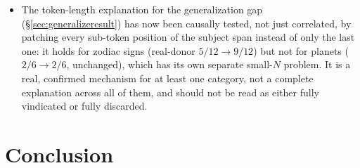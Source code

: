 \documentclass[11pt]{article}
\begin{document}
\begin{itemize}
        with no valid successor, and its headline accuracy is not
        statistically distinguishable from chance. Reporting binomial
        $p$-values and Wilson confidence intervals throughout this paper
        (added after the results above were first obtained) makes this
        precise rather than hiding it behind a bare percentage, but it does
        not fix the underlying small sample; a category with a genuinely
        real but modest effect and a category with no effect at all can
        look identical at $N=6$.
  \item The token-length explanation for the generalization gap
        (\S\ref{sec:generalizeresult}) has now been causally tested, not
        just correlated, by patching every sub-token position of the
        subject span instead of only the last one: it holds for zodiac
        signs (real-donor $5/12\to9/12$) but not for planets ($2/6\to2/6$,
        unchanged), which has its own separate small-$N$ problem. It is a
        real, confirmed mechanism for at least one category, not a complete
        explanation across all of them, and should not be read as either
        fully vindicated or fully discarded.
\end{itemize}

\section{Conclusion}
\end{document}
